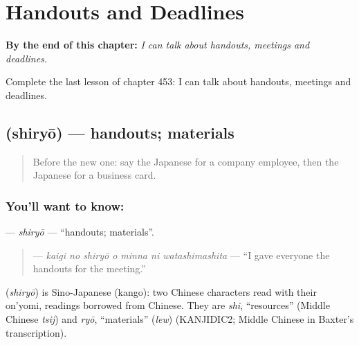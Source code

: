 
\chapter{Handouts and Deadlines}
\label{ch:ja-handouts-and-deadlines}

\begin{chapteropening}
\textbf{By the end of this chapter:} \emph{I can talk about handouts, meetings and deadlines.}

Complete the last lesson of chapter 453: I can talk about handouts, meetings and deadlines.
\end{chapteropening}

\section[\texorpdfstring{\ja{しりょう} (shiryō)}{しりょう (shiryō)}]{ (shiryō) — handouts; materials}

\label{lesson:JA-C453-shiryou}



\begin{quote}
Before the new one: say the Japanese for a company employee, then the Japanese for a business card.
\end{quote}

\subsection*{You'll want to know: }
\textbf{} — \emph{shiryō} — \textquotedblleft{}handouts; materials\textquotedblright{}.

\begin{quote}
\textbf{   } — \emph{kaigi no shiryō o minna ni watashimashita} — \textquotedblleft{}I gave everyone the handouts for the meeting.\textquotedblright{}
\end{quote}

\begin{cousinweb}
\textbf{} (\emph{shiryō}) is Sino-Japanese (kango): two Chinese characters read with their on'yomi, readings borrowed from Chinese. They are \emph{shi}, \textquotedblleft{}resources\textquotedblright{} (Middle Chinese \emph{tsij}) and \emph{ryō}, \textquotedblleft{}materials\textquotedblright{} (\emph{lew}) (KANJIDIC2; Middle Chinese in Baxter's transcription).
\end{cousinweb}

